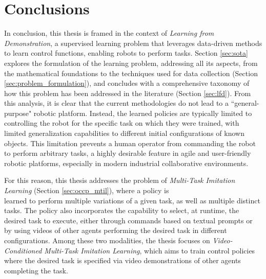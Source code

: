 \chapter{Conclusions}
\label{sec:conclusion}
In conclusion, this thesis is framed in the context of \textit{Learning from Demonstration}, a supervised learning problem that leverages data-driven methods to learn control functions, enabling robots to perform tasks. Section \ref{sec:sota} explores the formulation of the learning problem, addressing all its aspects, from the mathematical foundations to the techniques used for data collection (Section \ref{sec:problem_formulation}), and concludes with a comprehensive taxonomy of how this problem has been addressed in the literature (Section \ref{sec:lfd}). From this analysis, it is clear that the current methodologies do not lead to a ``general-purpose" robotic platform. Instead, the learned policies are typically limited to controlling the robot for the specific task on which they were trained, with limited generalization capabilities to different initial configurations of known objects. This limitation prevents a human operator from commanding the robot to perform arbitrary tasks, a highly desirable feature in agile and user-friendly robotic platforms, especially in modern industrial collaborative environments.

For this reason, this thesis addresses the problem of \textit{Multi-Task Imitation Learning} (Section \ref{sec:occp_mtil}), where a policy is \\ learned to perform multiple variations of a given task, as well as multiple distinct tasks. The policy also incorporates the capability to select, at runtime, the desired task to execute, either through commands based on textual prompts or by using videos of other agents performing the desired task in different configurations. Among these two modalities, the thesis focuses on \textit{Video-Conditioned Multi-Task Imitation Learning}, which aims to train control policies where the desired task is specified via video demonstrations of other agents completing the task.

